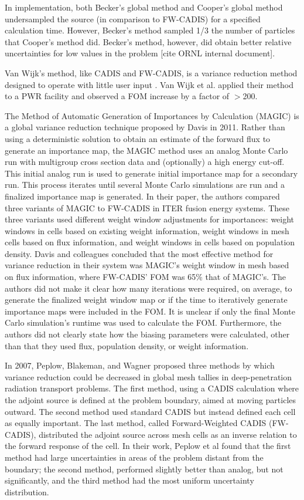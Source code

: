  In implementation, both Becker's global method and Cooper's global method
 undersampled the source (in comparison to FW-CADIS) for a specified calculation
 time. However, Becker's method sampled 1/3 the number of particles that
 Cooper's method did. Becker's method, however, did obtain better relative
 uncertainties for low values in the problem [cite ORNL internal document].

Van Wijk's method, like CADIS and FW-CADIS, is a variance reduction method
designed to operate with little user input \cite{van_wijk_easy_2011}.
Van Wijk et al. applied their method to a PWR facility and observed a FOM
increase by a factor of $>$200.


The Method of Automatic Generation of Importances by Calculation (MAGIC) is a
global variance reduction technique \cite{davis_comparison_2011} proposed by
Davis in 2011.
Rather than using a deterministic solution to obtain an estimate of the forward
flux to generate an importance map, the MAGIC method uses an analog Monte Carlo
run with multigroup cross section data and (optionally) a high energy cut-off.
This initial analog run is used to generate initial importance map for a
secondary run.
This process iterates until several Monte Carlo simulations are run and a
finalized importance map is generated.
In their paper, the authors compared three variants of MAGIC to FW-CADIS in ITER
fusion energy systems.
These three variants used different weight window adjustments for importances:
weight windows in cells based on existing weight information, weight windows in
mesh cells based on flux information, and weight windows in cells based on
population density.
Davis and colleagues concluded that the most effective method for variance
reduction in their system was MAGIC's weight window in mesh based on flux
information, where FW-CADIS' FOM was 65\% that of MAGIC's.
The authors did not make it clear how many iterations were required, on average,
to generate the finalized weight window map or if the time to iteratively
generate importance maps were included in the FOM.
It is unclear if only the final Monte Carlo simulation's runtime was used to
calculate the FOM.
Furthermore, the authors did not clearly state how the biasing parameters were
calculated, other than that they used flux, population density, or weight
information.

In 2007, Peplow, Blakeman, and Wagner \cite{peplow_advanced_2007} proposed three
methods by which variance reduction could be decreased in global mesh tallies in
deep-penetration radiation transport problems. The first method, using a CADIS
calculation where the adjoint source is defined at the problem boundary, aimed
at moving particles outward. The second method used standard CADIS but instead
defined each cell as equally important. The last method, called Forward-Weighted
CADIS (FW-CADIS), distributed the adjoint source across mesh cells as an inverse
relation to the forward response of the cell. In their work, Peplow et al found
that the first method had large uncertainties in areas of the problem distant
from the boundary; the second method, performed slightly better than analog, but
not significantly, and the third method had the most uniform uncertainty
distribution.


